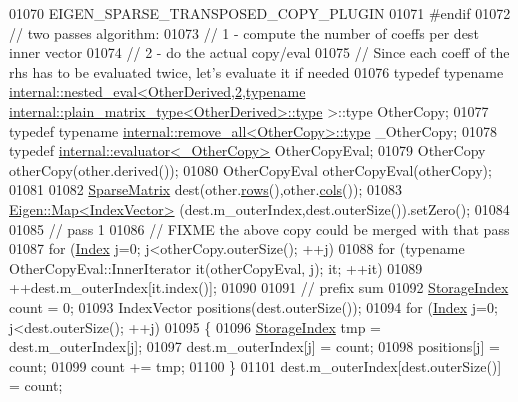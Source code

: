 \begin{DoxyCode}
01070       EIGEN\_SPARSE\_TRANSPOSED\_COPY\_PLUGIN
01071 \textcolor{preprocessor}{    #endif}
01072     \textcolor{comment}{// two passes algorithm:}
01073     \textcolor{comment}{//  1 - compute the number of coeffs per dest inner vector}
01074     \textcolor{comment}{//  2 - do the actual copy/eval}
01075     \textcolor{comment}{// Since each coeff of the rhs has to be evaluated twice, let's evaluate it if needed}
01076     \textcolor{keyword}{typedef} \textcolor{keyword}{typename} 
      \hyperlink{struct_eigen_1_1internal_1_1nested__eval}{internal::nested\_eval<OtherDerived,2,typename internal::plain\_matrix\_type<OtherDerived>::type}
       >::type OtherCopy;
01077     \textcolor{keyword}{typedef} \textcolor{keyword}{typename} \hyperlink{group___sparse_core___module}{internal::remove\_all<OtherCopy>::type} \_OtherCopy;
01078     \textcolor{keyword}{typedef} \hyperlink{struct_eigen_1_1internal_1_1evaluator}{internal::evaluator<\_OtherCopy>} OtherCopyEval;
01079     OtherCopy otherCopy(other.derived());
01080     OtherCopyEval otherCopyEval(otherCopy);
01081 
01082     \hyperlink{group___sparse_core___module_class_eigen_1_1_sparse_matrix}{SparseMatrix} dest(other.\hyperlink{group___sparse_core___module_a1944e9fa9ce7937bfc3a87b2cb94371f}{rows}(),other.\hyperlink{group___sparse_core___module_aca7ce296424ef6e478ab0fb19547a7ee}{cols}());
01083     \hyperlink{group___core___module_class_eigen_1_1_map}{Eigen::Map<IndexVector>} (dest.m\_outerIndex,dest.outerSize()).setZero();
01084 
01085     \textcolor{comment}{// pass 1}
01086     \textcolor{comment}{// FIXME the above copy could be merged with that pass}
01087     \textcolor{keywordflow}{for} (\hyperlink{group___core___module_a554f30542cc2316add4b1ea0a492ff02}{Index} j=0; j<otherCopy.outerSize(); ++j)
01088       \textcolor{keywordflow}{for} (\textcolor{keyword}{typename} OtherCopyEval::InnerIterator it(otherCopyEval, j); it; ++it)
01089         ++dest.m\_outerIndex[it.index()];
01090 
01091     \textcolor{comment}{// prefix sum}
01092     \hyperlink{group___sparse_core___module_a0b540ba724726ebe953f8c0df06081ed}{StorageIndex} count = 0;
01093     IndexVector positions(dest.outerSize());
01094     \textcolor{keywordflow}{for} (\hyperlink{group___core___module_a554f30542cc2316add4b1ea0a492ff02}{Index} j=0; j<dest.outerSize(); ++j)
01095     \{
01096       \hyperlink{group___sparse_core___module_a0b540ba724726ebe953f8c0df06081ed}{StorageIndex} tmp = dest.m\_outerIndex[j];
01097       dest.m\_outerIndex[j] = count;
01098       positions[j] = count;
01099       count += tmp;
01100     \}
01101     dest.m\_outerIndex[dest.outerSize()] = count;

\end{DoxyCode}
